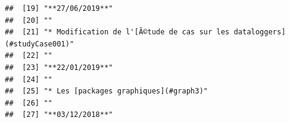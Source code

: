 \documentclass[]{book}
\begin{document}
\begin{verbatim}
##  [19] "**27/06/2019**"                                                                                                                                                                                                                                                                                             
##  [20] ""                                                                                                                                                                                                                                                                                                           
##  [21] "* Modification de l'[Ã©tude de cas sur les dataloggers](#studyCase001)"                                                                                                                                                                                                                                     
##  [22] ""                                                                                                                                                                                                                                                                                                           
##  [23] "**22/01/2019**"                                                                                                                                                                                                                                                                                             
##  [24] ""                                                                                                                                                                                                                                                                                                           
##  [25] "* Les [packages graphiques](#graph3)"                                                                                                                                                                                                                                                                       
##  [26] ""                                                                                                                                                                                                                                                                                                           
##  [27] "**03/12/2018**"                                                                                                                                                                                                                                                                                             

\end{verbatim}
\end{document}
